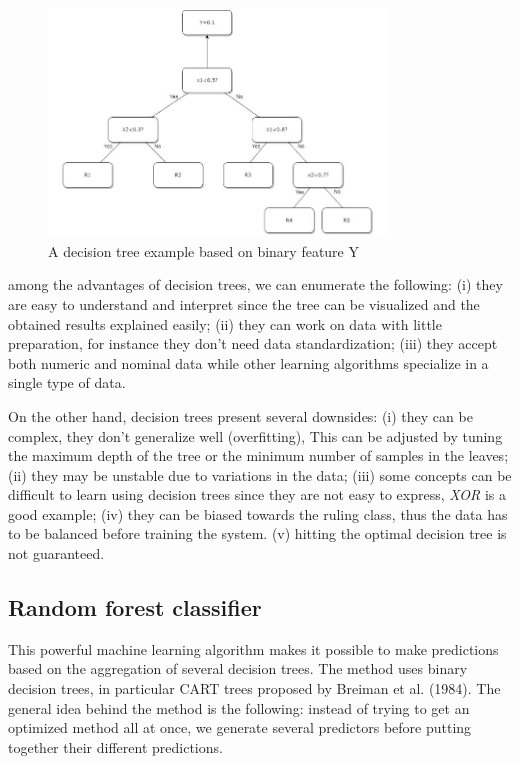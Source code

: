 \documentclass[LaM,binding=0.6cm, english]{sapthesis}
\begin{document}
\begin{figure}[h!]
    \includegraphics[width=0.8\textwidth]{images/Simple_Decision_Tree.jpg}
    \centering
    \caption{A decision tree example based on binary feature Y \cite{Song2015}}
    \label{fig:decision-tree}
\end{figure}

\par among the advantages of decision trees, we can enumerate the following: (i) they are easy to understand and interpret since the tree can be visualized and the obtained results explained easily; (ii) they can work on data with little preparation, for instance they don't need data standardization; (iii) they accept both numeric and nominal data while other learning algorithms specialize in a single type of data.

\par On the other hand, decision trees present several downsides: (i) they can be complex, they don't generalize well (overfitting), This can be adjusted by tuning the maximum depth of the tree or the minimum number of samples in the leaves; (ii) they may be unstable due to variations in the data; (iii) some concepts can be difficult to learn using decision trees since they are not easy to express, \textit{XOR} is a good example; (iv) they can be biased towards the ruling class, thus the data has to be balanced before training the system. (v) hitting the optimal decision tree is not guaranteed.

\subsection{Random forest classifier}

This powerful machine learning algorithm makes it possible to make predictions based on the aggregation of several decision trees. The method uses binary decision trees, in particular CART trees proposed by Breiman et al. (1984). The general idea behind the method is the following: instead of trying to get an optimized method all at once, we generate several predictors before putting together their different predictions.
\end{document}
